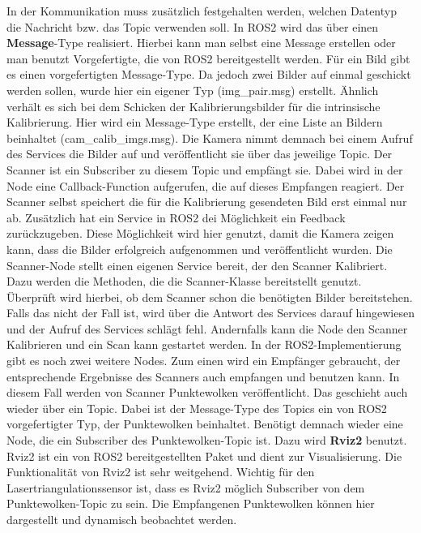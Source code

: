 		In der Kommunikation muss zusätzlich festgehalten werden, welchen Datentyp die Nachricht bzw. das Topic verwenden soll. In ROS2 wird das über einen \textbf{Message}-Type realisiert. Hierbei kann man selbst eine Message erstellen oder man benutzt Vorgefertigte, die von ROS2 bereitgestellt werden. Für ein Bild gibt es einen vorgefertigten Message-Type. Da jedoch zwei Bilder auf einmal geschickt werden sollen, wurde hier ein eigener Typ (img\_pair.msg) erstellt. Ähnlich verhält es sich bei dem Schicken der Kalibrierungsbilder für die intrinsische Kalibrierung. Hier wird ein Message-Type erstellt, der eine Liste an Bildern beinhaltet (cam\_calib\_imgs.msg). Die Kamera nimmt demnach bei einem Aufruf des Services die Bilder auf und veröffentlicht sie über das jeweilige Topic. Der Scanner ist ein Subscriber zu diesem Topic und empfängt sie. Dabei wird in der Node eine Callback-Function aufgerufen, die auf dieses Empfangen reagiert. Der Scanner selbst speichert die für die Kalibrierung gesendeten Bild erst einmal nur ab. Zusätzlich hat ein Service in ROS2 dei Möglichkeit ein Feedback zurückzugeben. Diese Möglichkeit wird hier genutzt, damit die Kamera zeigen kann, dass die Bilder erfolgreich aufgenommen und veröffentlicht wurden.\newline
		Die Scanner-Node stellt einen eigenen Service bereit, der den Scanner Kalibriert. Dazu werden die Methoden, die die Scanner-Klasse bereitstellt genutzt. Überprüft wird hierbei, ob dem Scanner schon die benötigten Bilder bereitstehen. Falls das nicht der Fall ist, wird über die Antwort des Services darauf hingewiesen und der Aufruf des Services schlägt fehl. Andernfalls kann die Node den Scanner Kalibrieren und ein Scan kann gestartet werden. \newline
		In der ROS2-Implementierung gibt es noch zwei weitere Nodes. Zum einen wird ein Empfänger gebraucht, der entsprechende Ergebnisse des Scanners auch empfangen und benutzen kann. In diesem Fall werden von Scanner Punktewolken veröffentlicht. Das geschieht auch wieder über ein Topic. Dabei ist der Message-Type des Topics ein von ROS2 vorgefertigter Typ, der Punktewolken beinhaltet. Benötigt demnach wieder eine Node, die ein Subscriber des Punktewolken-Topic ist. Dazu wird \textbf{Rviz2} benutzt. Rviz2 ist ein von ROS2 bereitgestellten Paket und dient zur Visualisierung. Die Funktionalität von Rviz2 ist sehr weitgehend. Wichtig für den Lasertriangulationssensor ist, dass es Rviz2 möglich Subscriber von dem Punktewolken-Topic zu sein. Die Empfangenen Punktewolken können hier dargestellt und dynamisch beobachtet werden. \newline
